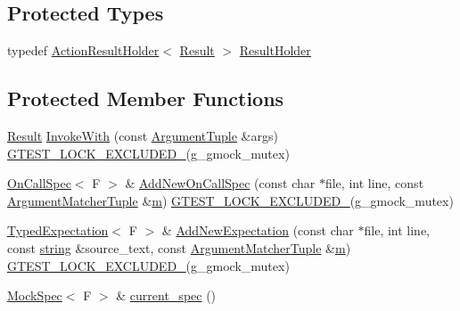 \subsection*{Protected Types}
\begin{DoxyCompactItemize}
\item 
typedef \hyperlink{classtesting_1_1internal_1_1ActionResultHolder}{Action\+Result\+Holder}$<$ \hyperlink{classtesting_1_1internal_1_1FunctionMockerBase_aa50abc4055b4d3a14ad64c317bccec8d}{Result} $>$ \hyperlink{classtesting_1_1internal_1_1FunctionMockerBase_aa4e1b2ee217676c9e70c3006b19a8074}{Result\+Holder}
\end{DoxyCompactItemize}
\subsection*{Protected Member Functions}
\begin{DoxyCompactItemize}
\item 
\hyperlink{classtesting_1_1internal_1_1FunctionMockerBase_aa50abc4055b4d3a14ad64c317bccec8d}{Result} \hyperlink{classtesting_1_1internal_1_1FunctionMockerBase_a869ec713f000b4e7829c660efc25e8cd}{Invoke\+With} (const \hyperlink{classtesting_1_1internal_1_1FunctionMockerBase_a336432a07e544af4ffb8103603471ca3}{Argument\+Tuple} \&args) \hyperlink{gtest-port_8h_a69abff5a4efdd07bd5faebe3dd318d06}{G\+T\+E\+S\+T\+\_\+\+L\+O\+C\+K\+\_\+\+E\+X\+C\+L\+U\+D\+E\+D\+\_\+}(g\+\_\+gmock\+\_\+mutex)
\item 
\hyperlink{classtesting_1_1internal_1_1OnCallSpec}{On\+Call\+Spec}$<$ F $>$ \& \hyperlink{classtesting_1_1internal_1_1FunctionMockerBase_a22ece3b6e8d24f11d8f4ba9c17b737c4}{Add\+New\+On\+Call\+Spec} (const char $\ast$file, int line, const \hyperlink{classtesting_1_1internal_1_1FunctionMockerBase_ab790bcb1dcf57fa6659365386723ae5a}{Argument\+Matcher\+Tuple} \&\hyperlink{app_2main_8cpp_a0d2d8836216fc94b61aa0824eb239db2}{m}) \hyperlink{gtest-port_8h_a69abff5a4efdd07bd5faebe3dd318d06}{G\+T\+E\+S\+T\+\_\+\+L\+O\+C\+K\+\_\+\+E\+X\+C\+L\+U\+D\+E\+D\+\_\+}(g\+\_\+gmock\+\_\+mutex)
\item 
\hyperlink{classtesting_1_1internal_1_1TypedExpectation}{Typed\+Expectation}$<$ F $>$ \& \hyperlink{classtesting_1_1internal_1_1FunctionMockerBase_aa2c35c565f08d3649436af443ece468f}{Add\+New\+Expectation} (const char $\ast$file, int line, const \hyperlink{namespacetesting_1_1internal_a8e8ff5b11e64078831112677156cb111}{string} \&source\+\_\+text, const \hyperlink{classtesting_1_1internal_1_1FunctionMockerBase_ab790bcb1dcf57fa6659365386723ae5a}{Argument\+Matcher\+Tuple} \&\hyperlink{app_2main_8cpp_a0d2d8836216fc94b61aa0824eb239db2}{m}) \hyperlink{gtest-port_8h_a69abff5a4efdd07bd5faebe3dd318d06}{G\+T\+E\+S\+T\+\_\+\+L\+O\+C\+K\+\_\+\+E\+X\+C\+L\+U\+D\+E\+D\+\_\+}(g\+\_\+gmock\+\_\+mutex)
\item 
\hyperlink{classtesting_1_1internal_1_1MockSpec}{Mock\+Spec}$<$ F $>$ \& \hyperlink{classtesting_1_1internal_1_1FunctionMockerBase_a744318106e20b346f4f1efbf5a601644}{current\+\_\+spec} ()
\end{DoxyCompactItemize}

